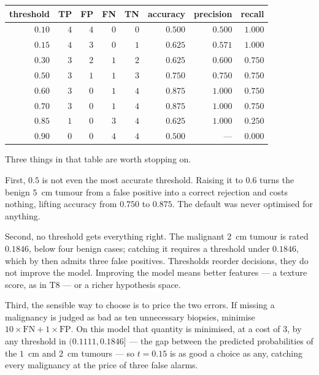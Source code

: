 \begin{center}
\small
\renewcommand{\arraystretch}{1.2}
\begin{tabular}{@{}rrrrrrrr@{}}
\toprule
threshold & TP & FP & FN & TN & accuracy & precision & recall\\
\midrule
$0.10$ & $4$ & $4$ & $0$ & $0$ & $0.500$ & $0.500$ & $1.000$\\
$0.15$ & $4$ & $3$ & $0$ & $1$ & $0.625$ & $0.571$ & $1.000$\\
$0.30$ & $3$ & $2$ & $1$ & $2$ & $0.625$ & $0.600$ & $0.750$\\
$0.50$ & $3$ & $1$ & $1$ & $3$ & $0.750$ & $0.750$ & $0.750$\\
$0.60$ & $3$ & $0$ & $1$ & $4$ & $0.875$ & $1.000$ & $0.750$\\
$0.70$ & $3$ & $0$ & $1$ & $4$ & $0.875$ & $1.000$ & $0.750$\\
$0.85$ & $1$ & $0$ & $3$ & $4$ & $0.625$ & $1.000$ & $0.250$\\
$0.90$ & $0$ & $0$ & $4$ & $4$ & $0.500$ & --- & $0.000$\\
\bottomrule
\end{tabular}
\end{center}

Three things in that table are worth stopping on.

First, $0.5$ is not even the most accurate threshold. Raising it to $0.6$ turns
the benign $5$~cm tumour from a false positive into a correct rejection and
costs nothing, lifting accuracy from $0.750$ to $0.875$. The default was never
optimised for anything.

Second, no threshold gets everything right. The malignant $2$~cm tumour is rated
$0.1846$, below four benign cases; catching it requires a threshold under
$0.1846$, which by then admits three false positives. Thresholds reorder
decisions, they do not improve the model. Improving the model means better
features --- a texture score, as in T8 --- or a richer hypothesis space.

Third, the sensible way to choose is to price the two errors. If missing a
malignancy is judged as bad as ten unnecessary biopsies, minimise
$10 \times \text{FN} + 1 \times \text{FP}$. On this model that quantity is
minimised, at a cost of $3$, by any threshold in $(0.1111, 0.1846]$ --- the gap
between the predicted probabilities of the $1$~cm and $2$~cm tumours --- so
$t = 0.15$ is as good a choice as any, catching every malignancy at the price of
three false alarms.

